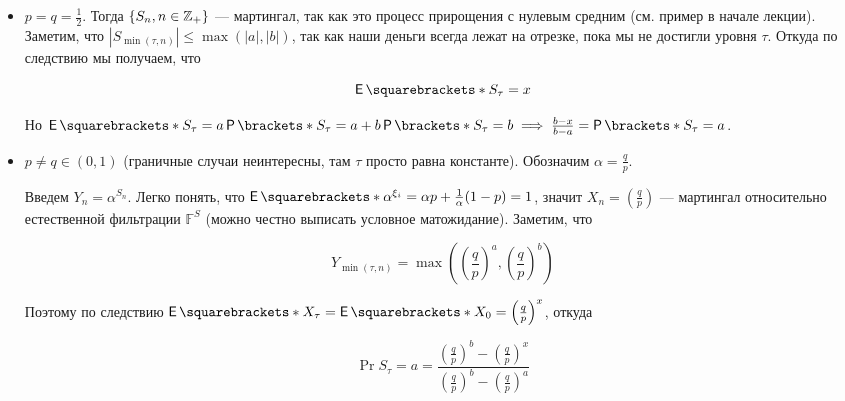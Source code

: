 \begin{itemize}
  \item $p = q = \frac12$. Тогда $\{S_n, n \in \mathbb{Z}_+\}$ --- мартингал, так как
  это процесс прирощения с нулевым средним (см. пример в начале лекции).
  Заметим, что $|S_{\min(\tau, n)}| \leq \max(|a|, |b|)$, так как наши деньги
  всегда лежат на отрезке, пока мы не достигли уровня $\tau$. Откуда по следствию
  мы получаем, что

  \[
    \E{S_\tau} = x
  \]

  Но $\E{S_\tau} = a\Pr{S_\tau = a} + b\Pr{S_\tau = b} \implies \frac{b - x}{b 
  - a} = \Pr{S_\tau = a}$.

  \item $p \neq q \in (0, 1)$ (граничные случаи неинтересны, там $\tau$ просто
  равна константе). Обозначим $\alpha = \frac{q}{p}$.

  Введем $Y_n = \alpha^{S_n}$. Легко понять, что $\E{\alpha^{\xi_i}} =
  \alpha p + \frac{1}{\alpha}(1 - p) = 1$, значит $X_n = \left(\frac{q}{p}\right)$
  --- мартингал относительно естественной фильтрации $\mathbb{F}^S$ (можно честно
  выписать условное матожидание). Заметим, что

  \[
    Y_{\min(\tau, n)} = \max\left(\left(\frac{q}{p}\right)^a, \left(\frac{q}{p}\right)^b\right)
  \]

  Поэтому по следствию $\E{X_{\tau}} = \E{X_0} = \left(\frac{q}{p}\right)^x$, откуда

  \[
    \Pr{S_{\tau} = a} = \frac{\left(\frac{q}{p}\right)^b - 
    \left(\frac{q}{p}\right)^x}{\left(\frac{q}{p}\right)^b - \left(\frac{q}{p}\right)^a}
  \]
\end{itemize}
